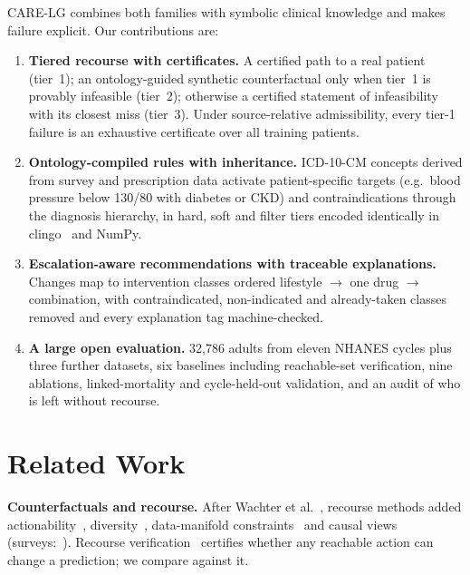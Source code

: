 \documentclass[conference]{IEEEtran}
\newcommand{\method}{CARE-LG}
\begin{document}
\method{} combines both families with symbolic clinical knowledge and makes failure explicit. Our contributions are:
\begin{enumerate}
  \item \textbf{Tiered recourse with certificates.} A certified path to a real patient (tier~1); an ontology-guided synthetic counterfactual only when tier~1 is provably infeasible (tier~2); otherwise a certified statement of infeasibility with its closest miss (tier~3). Under source-relative admissibility, every tier-1 failure is an exhaustive certificate over all training patients.
  \item \textbf{Ontology-compiled rules with inheritance.} ICD-10-CM concepts derived from survey and prescription data activate patient-specific targets (e.g.\ blood pressure below 130/80 with diabetes or CKD) and contraindications through the diagnosis hierarchy, in hard, soft and filter tiers encoded identically in clingo~\cite{gebser2019clingo} and NumPy.
  \item \textbf{Escalation-aware recommendations with traceable explanations.} Changes map to intervention classes ordered lifestyle $\to$ one drug $\to$ combination, with contraindicated, non-indicated and already-taken classes removed and every explanation tag machine-checked.
  \item \textbf{A large open evaluation.} 32,786 adults from eleven NHANES cycles plus three further datasets, six baselines including reachable-set verification, nine ablations, linked-mortality and cycle-held-out validation, and an audit of who is left without recourse.
\end{enumerate}

\section{Related Work}
\textbf{Counterfactuals and recourse.} After Wachter et al.~\cite{wachter2018counterfactual}, recourse methods added actionability~\cite{ustun2019actionable}, diversity~\cite{mothilal2020dice}, data-manifold constraints~\cite{poyiadzi2020face,pawelczyk2020cchvae} and causal views~\cite{mahajan2019causal,karimi2021interventions} (surveys:~\cite{karimi2022survey,verma2024review}). Recourse verification~\cite{kothari2024reach} certifies whether any reachable action can change a prediction; we compare against it.
\end{document}
